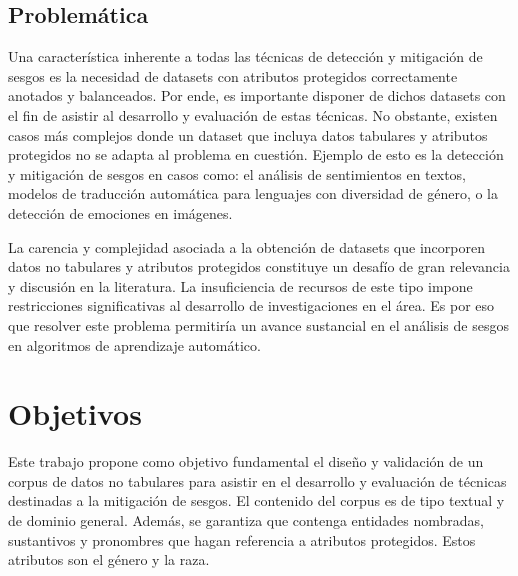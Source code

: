 
\subsection*{Problem\'atica}
Una caracter\'istica inherente a todas las t\'ecnicas de detecci\'on y mitigaci\'on de sesgos es la necesidad de datasets con 
atributos protegidos correctamente anotados y balanceados. Por ende, es importante disponer de dichos datasets con el fin de 
asistir al desarrollo y evaluaci\'on de estas t\'ecnicas. No obstante, existen casos m\'as complejos donde un dataset que incluya 
datos tabulares y atributos protegidos no se adapta al problema en cuesti\'on. Ejemplo de esto es la detecci\'on y mitigaci\'on de 
sesgos en casos como: el an\'alisis de sentimientos en textos, modelos de traducci\'on autom\'atica para lenguajes con diversidad 
de g\'enero, o la detecci\'on de emociones en im\'agenes.

La carencia y complejidad asociada a la obtenci\'on de datasets que incorporen datos no tabulares y atributos protegidos constituye un 
desaf\'io de gran relevancia y discusi\'on en la literatura. La insuficiencia de recursos de este tipo impone restricciones 
significativas al desarrollo de investigaciones en el \'area. Es por eso que resolver este problema permitir\'ia un avance sustancial 
en el an\'alisis de sesgos en algoritmos de aprendizaje autom\'atico.

\section*{Objetivos}
Este trabajo propone como objetivo fundamental el dise\~no y validaci\'on de un corpus de datos no tabulares para
asistir en el desarrollo y evaluaci\'on de t\'ecnicas destinadas a la mitigaci\'on de sesgos. El contenido del corpus
es de tipo textual y de dominio general. Adem\'as, se garantiza que contenga entidades nombradas, sustantivos y pronombres
que hagan referencia a atributos protegidos. Estos atributos son el g\'enero y la raza.

